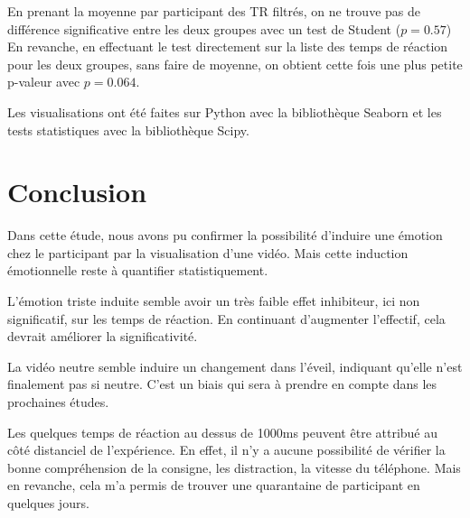 \documentclass{article}
\begin{document}
En prenant la moyenne par participant des TR filtrés, on ne trouve pas de différence significative entre les deux groupes avec un test de Student ($p=0.57$) \\
En revanche, en effectuant le test directement sur la liste des temps de réaction pour les deux groupes, sans faire de moyenne, on obtient cette fois une plus petite p-valeur avec $p=0.064$.

Les visualisations ont été faites sur Python avec la bibliothèque Seaborn et les tests statistiques avec la bibliothèque Scipy.

\section{Conclusion}
Dans cette étude, nous avons pu confirmer la possibilité d'induire une émotion chez le participant par la visualisation d'une vidéo. Mais cette induction émotionnelle reste à quantifier statistiquement.

L'émotion triste induite semble avoir un très faible effet inhibiteur, ici non significatif, sur les temps de réaction. En continuant d'augmenter l'effectif, cela devrait améliorer la significativité. 

La vidéo neutre semble induire un changement dans l'éveil, indiquant qu'elle n'est finalement pas si neutre. C'est un biais qui sera à prendre en compte dans les prochaines études.

Les quelques temps de réaction au dessus de 1000ms peuvent être attribué au côté distanciel de l'expérience. En effet, il n'y a aucune possibilité de vérifier la bonne compréhension de la consigne, les distraction, la vitesse du téléphone. Mais en revanche, cela m'a permis de trouver une quarantaine de participant en quelques jours.


\nocite{*}
\end{document}
